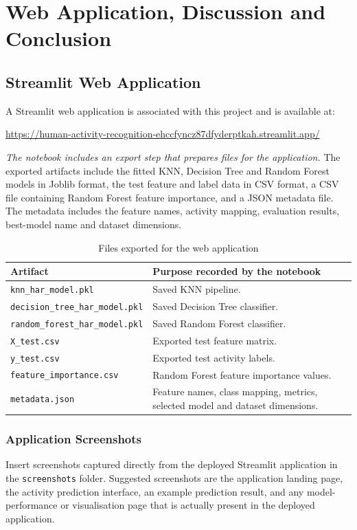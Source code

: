 \chapter{Web Application, Discussion and Conclusion}
\section{Streamlit Web Application}
A Streamlit web application is associated with this project and is available at:
\begin{center}
\url{https://human-activity-recognition-ehccfyncz87dfyderptkah.streamlit.app/}
\end{center}

\emph{The notebook includes an export step that prepares files for the application.} The exported artifacts include the fitted KNN, Decision Tree and Random Forest models in Joblib format, the test feature and label data in CSV format, a CSV file containing Random Forest feature importance, and a JSON metadata file. The metadata includes the feature names, activity mapping, evaluation results, best-model name and dataset dimensions.

\begin{table}[H]\centering
\caption{Files exported for the web application}
\begin{tabular}{lp{8.2cm}}
\toprule
\textbf{Artifact} & \textbf{Purpose recorded by the notebook}\\
\midrule
\texttt{knn\_har\_model.pkl} & Saved KNN pipeline.\\
\texttt{decision\_tree\_har\_model.pkl} & Saved Decision Tree classifier.\\
\texttt{random\_forest\_har\_model.pkl} & Saved Random Forest classifier.\\
\texttt{X\_test.csv} & Exported test feature matrix.\\
\texttt{y\_test.csv} & Exported test activity labels.\\
\texttt{feature\_importance.csv} & Random Forest feature importance values.\\
\texttt{metadata.json} & Feature names, class mapping, metrics, selected model and dataset dimensions.\\
\bottomrule
\end{tabular}
\end{table}

\subsection{Application Screenshots}
Insert screenshots captured directly from the deployed Streamlit application in the \texttt{screenshots} folder. Suggested screenshots are the application landing page, the activity prediction interface, an example prediction result, and any model-performance or visualisation page that is actually present in the deployed application.

